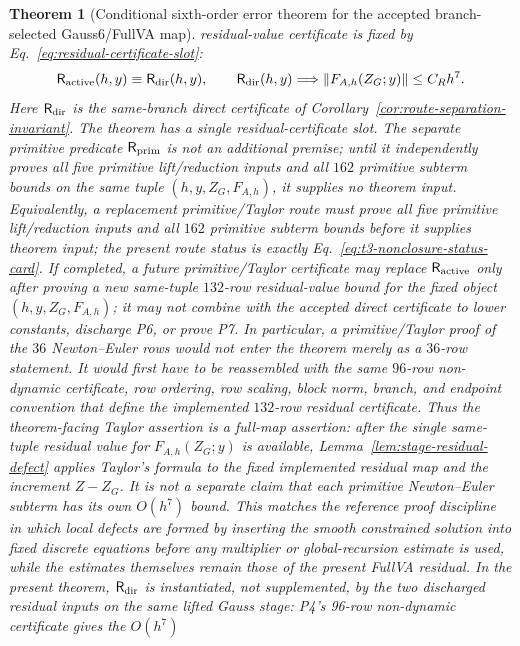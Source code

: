 \documentclass[preprint,12pt]{elsarticle}
\newtheorem{theorem}{Theorem}
\newcommand{\method}{Gauss6\slash FullVA}
\begin{document}
\begin{theorem}[Conditional sixth-order error theorem for the accepted branch-selected \method{} map]
residual-value certificate is fixed by Eq.~\eqref{eq:residual-certificate-slot}:
\begin{equation}
\label{eq:residual-certificate-slot}
  \mathsf R_{\rm active}(h,y)\equiv \mathsf R_{\rm dir}(h,y),
  \qquad
  \mathsf R_{\rm dir}(h,y)\Longrightarrow
  \|F_{A,h}(Z_G;y)\|\le C_Rh^7 .
\end{equation}
Here \(\mathsf R_{\rm dir}\) is the same-branch direct certificate of
Corollary~\ref{cor:route-separation-invariant}.  The theorem has a single
residual-certificate slot.  The separate primitive predicate
\(\mathsf R_{\rm prim}\) is not an additional premise; until it independently
proves all five primitive lift/reduction inputs and all \(162\) primitive
subterm bounds on the same tuple \((h,y,Z_G,F_{A,h})\), it supplies no theorem
input.  Equivalently, a replacement primitive/Taylor route must prove all five
primitive lift/reduction inputs and all \(162\) primitive subterm bounds before
it supplies theorem input; the present route status is exactly
Eq.~\eqref{eq:t3-nonclosure-status-card}.  If completed, a future primitive/Taylor certificate
may replace \(\mathsf R_{\rm active}\) only after proving a new same-tuple \(132\)-row
residual-value bound for the fixed object \((h,y,Z_G,F_{A,h})\); it may not combine with the accepted direct certificate to lower constants, discharge P6,
or prove P7.
In particular, a primitive/Taylor proof of the \(36\) Newton--Euler rows would
not enter the theorem merely as a \(36\)-row statement.  It would first have
to be reassembled with the same \(96\)-row non-dynamic certificate, row
ordering, row scaling, block norm, branch, and endpoint convention that define
the implemented \(132\)-row residual certificate.
Thus the theorem-facing Taylor assertion is a full-map assertion: after the
single same-tuple residual value for \(F_{A,h}(Z_G;y)\) is available,
Lemma~\ref{lem:stage-residual-defect} applies Taylor's formula to the fixed
implemented residual map and the increment \(Z-Z_G\).  It is not a separate
claim that each primitive Newton--Euler subterm has its own \(O(h^7)\) bound.
This matches the reference proof discipline in which local defects are formed
by inserting the smooth constrained solution into fixed discrete equations
before any multiplier or global-recursion estimate is used, while the
estimates themselves remain those of the present FullVA residual.
In the present theorem, \(\mathsf R_{\rm dir}\) is instantiated, not
supplemented, by the two discharged residual inputs on the same lifted Gauss
stage: P4's 96-row non-dynamic certificate gives the \(O(h^7)\)

\end{theorem}
\end{document}
